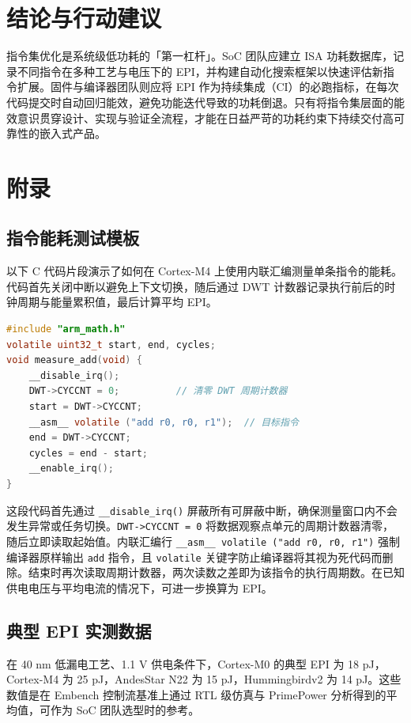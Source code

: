 \chapter{结论与行动建议}
指令集优化是系统级低功耗的「第一杠杆」。SoC 团队应建立 ISA 功耗数据库，记录不同指令在多种工艺与电压下的 EPI，并构建自动化搜索框架以快速评估新指令扩展。固件与编译器团队则应将 EPI 作为持续集成（CI）的必跑指标，在每次代码提交时自动回归能效，避免功能迭代导致的功耗倒退。只有将指令集层面的能效意识贯穿设计、实现与验证全流程，才能在日益严苛的功耗约束下持续交付高可靠性的嵌入式产品。\par
\chapter{附录}
\section{指令能耗测试模板}
以下 C 代码片段演示了如何在 Cortex-M4 上使用内联汇编测量单条指令的能耗。代码首先关闭中断以避免上下文切换，随后通过 DWT 计数器记录执行前后的时钟周期与能量累积值，最后计算平均 EPI。\par
\begin{lstlisting}[language=c]
#include "arm_math.h"
volatile uint32_t start, end, cycles;
void measure_add(void) {
    __disable_irq();
    DWT->CYCCNT = 0;          // 清零 DWT 周期计数器
    start = DWT->CYCCNT;
    __asm__ volatile ("add r0, r0, r1");  // 目标指令
    end = DWT->CYCCNT;
    cycles = end - start;
    __enable_irq();
}
\end{lstlisting}
这段代码首先通过 \texttt{\_{}\_{}disable\_{}irq()} 屏蔽所有可屏蔽中断，确保测量窗口内不会发生异常或任务切换。\texttt{DWT->CYCCNT = 0} 将数据观察点单元的周期计数器清零，随后立即读取起始值。内联汇编行 \texttt{\_{}\_{}asm\_{}\_{} volatile ("add r0, r0, r1")} 强制编译器原样输出 \texttt{add} 指令，且 \texttt{volatile} 关键字防止编译器将其视为死代码而删除。结束时再次读取周期计数器，两次读数之差即为该指令的执行周期数。在已知供电电压与平均电流的情况下，可进一步换算为 EPI。\par
\section{典型 EPI 实测数据}
在 40 nm 低漏电工艺、1.1 V 供电条件下，Cortex-M0 的典型 EPI 为 18 pJ，Cortex-M4 为 25 pJ，AndesStar N22 为 15 pJ，Hummingbirdv2 为 14 pJ。这些数值是在 Embench 控制流基准上通过 RTL 级仿真与 PrimePower 分析得到的平均值，可作为 SoC 团队选型时的参考。\par
